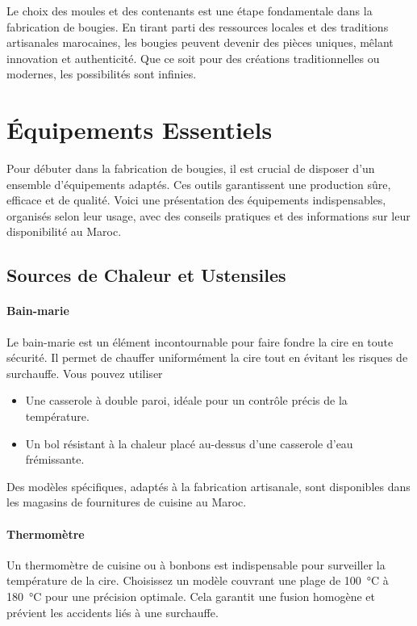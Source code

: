 \documentclass[11pt,fleqn,onecolumn,oneside]{book}
\begin{document}
\begin{corollary}
Le choix des moules et des contenants est une étape fondamentale dans la fabrication de bougies. En tirant parti des ressources locales et des traditions artisanales marocaines, les bougies peuvent devenir des pièces uniques, mêlant innovation et authenticité. Que ce soit pour des créations traditionnelles ou modernes, les possibilités sont infinies.
\end{corollary}

\section{Équipements Essentiels}

Pour débuter dans la fabrication de bougies, il est crucial de disposer d’un ensemble d’équipements adaptés. Ces outils garantissent une production sûre, efficace et de qualité. Voici une présentation des équipements indispensables, organisés selon leur usage, avec des conseils pratiques et des informations sur leur disponibilité au Maroc.

\subsection*{Sources de Chaleur et Ustensiles}

\paragraph{Bain-marie} 
Le bain-marie est un élément incontournable pour faire fondre la cire en toute sécurité. Il permet de chauffer uniformément la cire tout en évitant les risques de surchauffe. Vous pouvez utiliser
\begin{itemize}
    \item Une casserole à double paroi, idéale pour un contrôle précis de la température.
    \item Un bol résistant à la chaleur placé au-dessus d’une casserole d’eau frémissante.
\end{itemize}
Des modèles spécifiques, adaptés à la fabrication artisanale, sont disponibles dans les magasins de fournitures de cuisine au Maroc.

\paragraph{Thermomètre}
Un thermomètre de cuisine ou à bonbons est indispensable pour surveiller la température de la cire. Choisissez un modèle couvrant une plage de \SI{100}{\degreeCelsius} à \SI{180}{\degreeCelsius} pour une précision optimale. Cela garantit une fusion homogène et prévient les accidents liés à une surchauffe.
\end{document}
